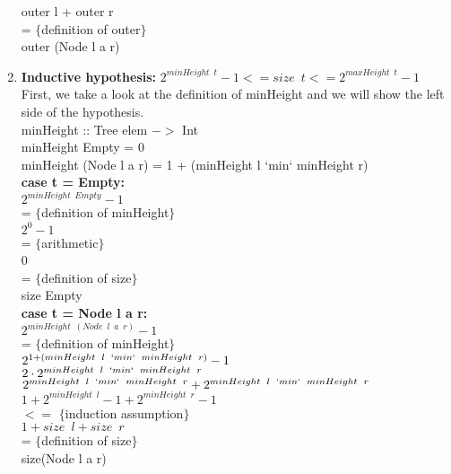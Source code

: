 \documentclass{article}
\begin{document}
\begin{enumerate}
\begin{minipage}[t]{1\textwidth}
  outer l + outer r \\
  = $\{$definition of outer$\}$ \\
  outer (Node l a r)
  \end{minipage}
  \item
  \textbf{Inductive hypothesis:} $2^{minHeight \enspace t} - 1 <= size \enspace t <= 2^{maxHeight \enspace t} - 1$ \\
  First, we take a look at the definition of minHeight and we will show the left side of the hypothesis. \\
  minHeight :: Tree elem $->$ Int \\
  minHeight Empty = 0 \\
  minHeight (Node l a r) = 1 + (minHeight l `min` minHeight r) \\
  \newline
  \textbf{case t = Empty:} \\
  $2^{minHeight \enspace Empty} - 1$ \\
  = $\{$definition of minHeight$\}$ \\
  $2^0 - 1$ \\
  = $\{$arithmetic$\}$ \\
  0 \\
  = $\{$definition of size$\}$ \\
  size Empty \\
  \newline
  \textbf{case t = Node l a r:} \\
  $2^{minHeight \enspace (Node \enspace l \enspace a \enspace r)} - 1$ \\
  = $\{$definition of minHeight$\}$ \\
  $2^{1 + (minHeight \enspace l \enspace `min` \enspace minHeight \enspace r)} - 1$ \\
  $2 \cdot 2^{minHeight \enspace l \enspace `min` \enspace minHeight \enspace r}$ \\
  $2^{minHeight \enspace l \enspace `min` \enspace minHeight \enspace r} + 2^{minHeight \enspace l \enspace `min` \enspace minHeight \enspace r}$ \\
  $1 + 2^{minHeight \enspace l} - 1 + 2^{minHeight \enspace r} - 1$ \\
  $<=$ $\{$induction assumption$\}$ \\
  $1 + size \enspace l + size \enspace r$ \\
  = $\{$definition of size$\}$ \\
  size(Node l a r)


\end{enumerate}
\end{document}
